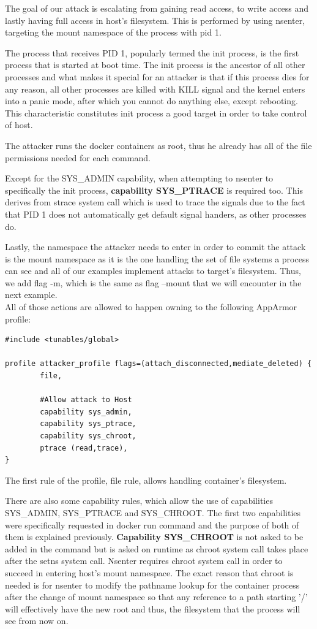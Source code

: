 The goal of our attack is escalating from gaining read access, to write access and lastly having full access in host's filesystem. This is performed by using nsenter, targeting the mount namespace of the process with pid 1.

The process that receives PID 1, popularly termed the init process, is the first process that is started at boot time. The init process is the ancestor of all other processes and what makes it special for an attacker is that if this process dies for any reason, all other processes are killed with KILL signal and the kernel enters into a panic mode, after which you cannot do anything else, except rebooting. This characteristic constitutes init process a good target in order to take control of host.

The attacker runs the docker containers as root, thus he already has all of the file permissions needed for each command.

Except for the SYS\_ADMIN capability, when attempting to nsenter to specifically the init process, \textbf{capability SYS\_PTRACE} is required too. This derives from strace system call which is used to trace the signals due to the fact that PID 1 does not automatically get default signal handers, as other processes do.

Lastly, the namespace the attacker needs to enter in order to commit the attack is the mount namespace as it is the one handling the set of file systems a process can see and all of our examples implement attacks to target's filesystem. Thus, we add flag -m, which is the same as flag --mount that we will encounter in the next example.
\\
All of those actions are allowed to happen owning to the following AppArmor profile:

\begin{lstlisting}[style=Dockerfile, caption={AppArmor profile attacker\_profile}]
#include <tunables/global>

profile attacker_profile flags=(attach_disconnected,mediate_deleted) {
        file, 

        #Allow attack to Host
        capability sys_admin,
        capability sys_ptrace,
        capability sys_chroot,
        ptrace (read,trace),
}
\end{lstlisting}

The first rule of the profile, file rule, allows handling container's filesystem.

There are also some capability rules, which allow the use of capabilities SYS\_ADMIN, SYS\_PTRACE and SYS\_CHROOT. The first two capabilities were specifically requested in docker run command and the purpose of both of them is explained previously. \textbf{Capability SYS\_CHROOT} is not asked to be added in the command but is asked on runtime as chroot system call takes place after the setns system call. Nsenter requires chroot system call in order to succeed in entering host's mount namespace. The exact reason that chroot is needed is for nsenter to modify the pathname lookup for the container process after the change of mount namespace so that any reference to a path starting '/' will effectively have the new root and thus, the filesystem that the process will see from now on. 

